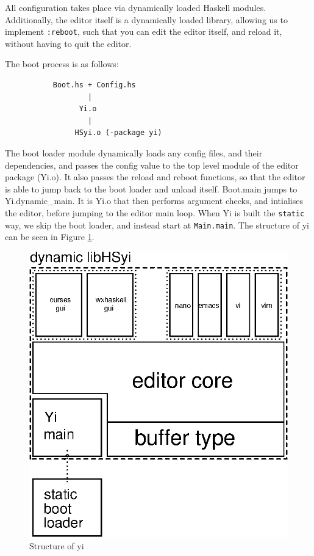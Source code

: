 \documentclass[]{article}
\newcommand{\code}[1]{\texttt{#1}}
\begin{document}
All configuration takes place via dynamically loaded Haskell modules.
Additionally, the editor itself is a dynamically loaded library,
allowing us to implement \code{:reboot}, such that you can edit the
editor itself, and reload it, without having to quit the editor.
        
The boot process is as follows:

\begin{verbatim}
           Boot.hs + Config.hs
                   |
                 Yi.o
                   |
                HSyi.o (-package yi)
\end{verbatim}

The boot loader module dynamically loads any config files, and their
dependencies, and passes the config value to the top level module of the
editor package (Yi.o). It also passes the reload and reboot functions,
so that the editor is able to jump back to the boot loader and unload
itself. Boot.main jumps to Yi.dynamic\_main. It is Yi.o that then
performs argument checks, and intialises the editor, before jumping to
the editor main loop. When Yi is built the \code{static} way, we skip
the boot loader, and instead start at \code{Main.main}. The structure of
yi can be seen in Figure \ref{overview}.

\begin{figure} 
  \begin{center}
    \includegraphics[scale=0.7]{yi_overview.eps} 
    \caption{Structure of yi}
    \label{overview} 
  \end{center} 
\end{figure}
%
\end{document}
